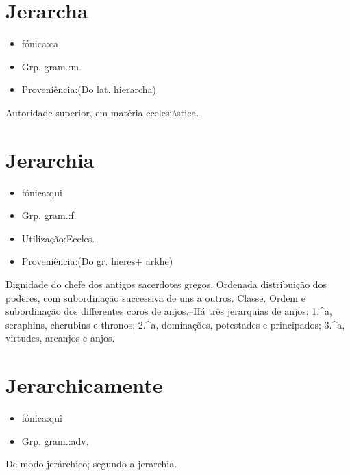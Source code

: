 \documentclass{article}
\begin{document}
\section{Jerarcha}
\begin{itemize}
\item {fónica:ca}
\end{itemize}
\begin{itemize}
\item {Grp. gram.:m.}
\end{itemize}
\begin{itemize}
\item {Proveniência:(Do lat. \textunderscore hierarcha\textunderscore )}
\end{itemize}
Autoridade superior, em matéria ecclesiástica.
\section{Jerarchia}
\begin{itemize}
\item {fónica:qui}
\end{itemize}
\begin{itemize}
\item {Grp. gram.:f.}
\end{itemize}
\begin{itemize}
\item {Utilização:Eccles.}
\end{itemize}
\begin{itemize}
\item {Proveniência:(Do gr. \textunderscore hieres\textunderscore  + \textunderscore arkhe\textunderscore )}
\end{itemize}
Dignidade do chefe dos antigos sacerdotes gregos.
Ordenada distribuição dos poderes, com subordinação successiva de uns a outros.
Classe.
Ordem e subordinação dos differentes coros de anjos.--Há três jerarquias de anjos: 1.^a, seraphins, cherubins e thronos; 2.^a, dominações, potestades e principados; 3.^a, virtudes, arcanjos e anjos.
\section{Jerarchicamente}
\begin{itemize}
\item {fónica:qui}
\end{itemize}
\begin{itemize}
\item {Grp. gram.:adv.}
\end{itemize}
De modo jerárchico; segundo a jerarchia.
\end{document}
